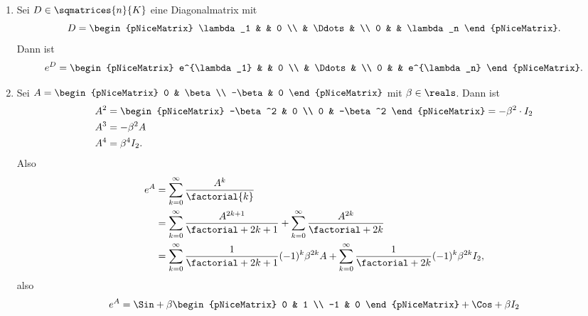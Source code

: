 \begin{beispiele*}
  \begin{enumerate}
    \item\label{exponentialabbildung:diagonalmatrix} Sei \( D\in \sqmatrices{n}{K} \) eine Diagonalmatrix mit
    \begin{equation*}
      D=\begin{pNiceMatrix} \lambda_1 &  & 0 \\  & \Ddots &  \\ 0 &  & \lambda_n \end{pNiceMatrix}.
    \end{equation*}
    Dann ist
    \begin{equation*}
      e^D=\begin{pNiceMatrix} e^{\lambda_1} &  & 0 \\  & \Ddots &  \\ 0 &  & e^{\lambda_n} \end{pNiceMatrix}.
    \end{equation*}
    \item\label{exponentialabbildung:abwechselmatrix} Sei \( A=\begin{pNiceMatrix} 0 & \beta \\ -\beta & 0 \end{pNiceMatrix} \) mit \( \beta\in \reals \). Dann ist
    \begin{align*}
      A^2&=\begin{pNiceMatrix} -\beta^2 & 0 \\ 0 & -\beta^2 \end{pNiceMatrix}=-\beta^2\cdot I_2\\
      A^3&=-\beta^2A\\
      A^4&=\beta^4 I_2.
    \end{align*}
  Also
  \begin{align*}
    e^A&=\sum_{k=0}^{\infty}\frac{A^k}{\factorial{k}}\\
    &=\sum_{k=0}^{\infty}\frac{A^{2k+1}}{\factorial+{2k+1}}+\sum_{k=0}^{\infty}\frac{A^{2k}}{\factorial+{2k}}\\
    &=\sum_{k=0}^{\infty}\frac{1}{\factorial+{2k+1}}(-1)^k \beta^{2k}A+\sum_{k=0}^{\infty}\frac{1}{\factorial+{2k}}(-1)^k \beta^{2k}I_2,
  \end{align*}
  also
  \begin{align*}
    e^A&=\Sin+{\beta}\begin{pNiceMatrix} 0 & 1 \\ -1 & 0 \end{pNiceMatrix}+\Cos+{\beta}I_2\\

\end{align*}
\end{enumerate}
\end{beispiele*}
